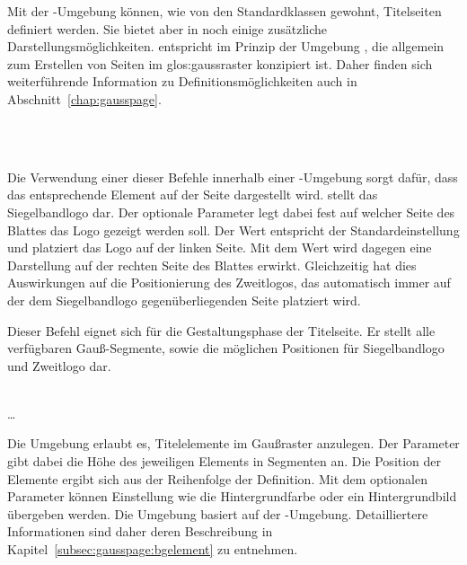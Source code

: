 Mit der -Umgebung können, wie von den Standardklassen
gewohnt, Titelseiten definiert werden. Sie bietet aber in \tubslatex noch einige
zusätzliche Darstellungsmöglichkeiten.  entspricht
im Prinzip der Umgebung , die allgemein zum Erstellen
von Seiten im \gls{glos:gaussraster} konzipiert ist. Daher finden sich
weiterführende Information zu Definitionsmöglichkeiten auch in
Abschnitt~\ref{chap:gausspage}.

\begin{Declaration}
  \\
  \\
\end{Declaration}

Die Verwendung einer dieser Befehle innerhalb einer -Umgebung
sorgt dafür, dass das entsprechende Element auf der Seite dargestellt wird.
 stellt das Siegelbandlogo dar. Der optionale Parameter
 legt dabei fest auf welcher Seite des Blattes
das Logo gezeigt werden soll.
Der Wert  entspricht der Standardeinstellung und platziert das Logo auf der linken Seite.
Mit dem Wert  wird dagegen eine Darstellung auf der rechten
Seite des Blattes erwirkt. Gleichzeitig hat dies Auswirkungen
auf die Positionierung des Zweitlogos, das automatisch immer auf der 
dem Siegelbandlogo gegenüberliegenden Seite platziert wird.

\begin{Declaration}
\end{Declaration}

Dieser Befehl eignet sich für die Gestaltungsphase der Titelseite.
Er stellt alle verfügbaren Gauß-Segmente, sowie die möglichen Positionen
für Siegelbandlogo und Zweitlogo dar.

\begin{Declaration}
    \\
  \quad\dots\\
\end{Declaration}

Die Umgebung  erlaubt es, Titelelemente im 
Gaußraster anzulegen. Der Parameter  gibt dabei
die Höhe des jeweiligen Elements in Segmenten an. Die Position der Elemente
ergibt sich aus der Reihenfolge der Definition.
Mit dem optionalen Parameter  können Einstellung wie
die Hintergrundfarbe oder ein Hintergrundbild übergeben werden.
Die Umgebung basiert auf der -Umgebung.
Detailliertere Informationen sind daher deren Beschreibung
in Kapitel~\ref{subsec:gausspage:bgelement} zu entnehmen.

